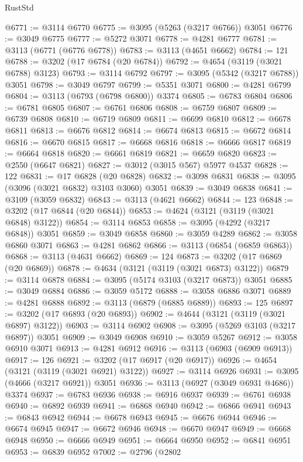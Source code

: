 \begin{lexlean}{RustStd}
\begin{coremodule}
{\begin{coremodule}
{{{{{{{{{{{{{{{{{{{{{{{{{{{{{{{{@6771 := @3114 @6770
@6775 := @3095 (@5263 (@3217 @6766)) @3051
@6776 := @3049 @6775
@6777 := @5272 @3071
@6778 := @4281 @6777
@6781 := @3113 (@6771 (@6776 @6778))
@6783 := @3113 (@4651 @6662)
@6784 := 121
@6788 := @3202 (@17 @6784 (@20 @6784))
@6792 := @4654 (@3119 (@3021 @6788) @3123)
@6793 := @3114 @6792
@6797 := @3095 (@5342 (@3217 @6788)) @3051
@6798 := @3049 @6797
@6799 := @5351 @3071
@6800 := @4281 @6799
@6804 := @3113 (@6793 (@6798 @6800)) @3374
@6805 := @6783 @6804
@6806 := @6781 @6805
@6807 := @6761 @6806
@6808 := @6759 @6807
@6809 := @6739 @6808
@6810 := @6719 @6809
@6811 := @6699 @6810
@6812 := @6678 @6811
@6813 := @6676 @6812
@6814 := @6674 @6813
@6815 := @6672 @6814
@6816 := @6670 @6815
@6817 := @6668 @6816
@6818 := @6666 @6817
@6819 := @6664 @6818
@6820 := @6661 @6819
@6821 := @6659 @6820
@6823 := @2550 (@6647 @6821)
@6827 := @3012 (@3015 @567) @5977 @4537
@6828 := 122
@6831 := @17 @6828 (@20 @6828)
@6832 := @3098 @6831
@6838 := @3095 (@3096 (@3021 @6832) @3103 @3060) @3051
@6839 := @3049 @6838
@6841 := @3109 (@3059 @6832)
@6843 := @3113 (@4621 @6662)
@6844 := 123
@6848 := @3202 (@17 @6844 (@20 @6844))
@6853 := @4624 (@3121 (@3119 (@3021 @6848) @3122))
@6854 := @3114 @6853
@6858 := @3095 (@4292 (@3217 @6848)) @3051
@6859 := @3049 @6858
@6860 := @3059 @4289
@6862 := @3058 @6860 @3071
@6863 := @4281 @6862
@6866 := @3113 (@6854 (@6859 @6863))
@6868 := @3113 (@4631 @6662)
@6869 := 124
@6873 := @3202 (@17 @6869 (@20 @6869))
@6878 := @4634 (@3121 (@3119 (@3021 @6873) @3122))
@6879 := @3114 @6878
@6884 := @3095 (@5174 @3103 (@3217 @6873)) @3051
@6885 := @3049 @6884
@6886 := @3059 @5172
@6888 := @3058 @6886 @3071
@6889 := @4281 @6888
@6892 := @3113 (@6879 (@6885 @6889))
@6893 := 125
@6897 := @3202 (@17 @6893 (@20 @6893))
@6902 := @4644 (@3121 (@3119 (@3021 @6897) @3122))
@6903 := @3114 @6902
@6908 := @3095 (@5269 @3103 (@3217 @6897)) @3051
@6909 := @3049 @6908
@6910 := @3059 @5267
@6912 := @3058 @6910 @3071
@6913 := @4281 @6912
@6916 := @3113 (@6903 (@6909 @6913))
@6917 := 126
@6921 := @3202 (@17 @6917 (@20 @6917))
@6926 := @4654 (@3121 (@3119 (@3021 @6921) @3122))
@6927 := @3114 @6926
@6931 := @3095 (@4666 (@3217 @6921)) @3051
@6936 := @3113 (@6927 (@3049 @6931 @4686)) @3374
@6937 := @6783 @6936
@6938 := @6916 @6937
@6939 := @6761 @6938
@6940 := @6892 @6939
@6941 := @6868 @6940
@6942 := @6866 @6941
@6943 := @6843 @6942
@6944 := @6678 @6943
@6945 := @6676 @6944
@6946 := @6674 @6945
@6947 := @6672 @6946
@6948 := @6670 @6947
@6949 := @6668 @6948
@6950 := @6666 @6949
@6951 := @6664 @6950
@6952 := @6841 @6951
@6953 := @6839 @6952
@7002 := @2796
    (@2802
}}}}}}}}}}}}}}}}}}}}}}}}}}}}}}}}
\end{coremodule}}
\end{coremodule}
\end{lexlean}
